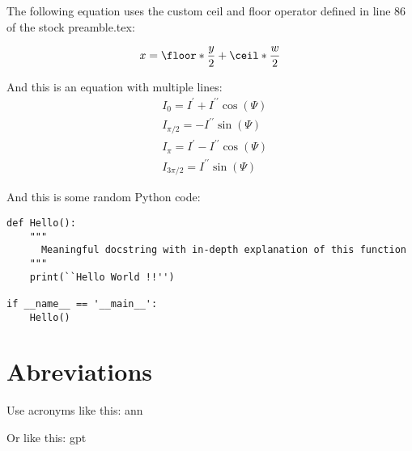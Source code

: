 The following equation uses the custom ceil and floor operator defined in line 86 of the stock preamble.tex:

\begin{equation}
x = \floor*{\frac{y}{2}} + \ceil*{\frac{w}{2}}
\end{equation}


And this is an equation with multiple lines:
\begin{equation}
\begin{aligned}
&I_{0}=I^{\prime}+I^{\prime\prime}\cos(\varPsi)   \\
&I_{\pi/2}=-I^{\prime\prime}\sin(\varPsi)                \\
&I_{\pi}=I^{\prime}-I^{\prime\prime}\cos(\varPsi)   \\
&I_{3\pi/2}=I^{\prime\prime}\sin(\varPsi)
\end{aligned}
\end{equation}

And this is some random Python code:

\begin{lstlisting}[style = Python]
def Hello():
    """
      Meaningful docstring with in-depth explanation of this function
    """
    print(``Hello World !!'')

if __name__ == '__main__':
    Hello()
\end{lstlisting}
\section{Abreviations}

Use acronyms like this: \ac{ann}

Or like this: \ac{gpt}